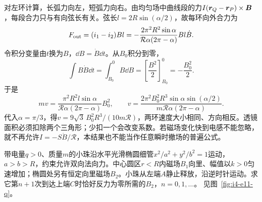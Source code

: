\begin{solution}
对左环计算，长弧力向左，短弧力向右。由均匀场中曲线段的力$I(\bm{r}_Q-\bm{r}_P)\times\bm{B}$，每段合力只与有向弦长有关。弦长$l=2R\sin(\alpha/2)$，故每环向外合力为
\[
F_{\rm out}=(i_1-i_2)Bl
=-\frac{2\pi^2R^2\sin\alpha}{\mathcal R\alpha(2\pi-\alpha)}Bl\dot B.
\]
令积分变量由$t$换为$B$，$\dd B=\dot B\dd t$。从$B_0$积分到零，
\[\int B\dot B\dd t=\int_{B_0}^0B\dd B
=\left[\frac{B^2}{2}\right]_{B_0}^0=-\frac{B_0^2}{2}.\]
于是
\[
mv=\frac{\pi^2R^2l\sin\alpha}{\mathcal R\alpha(2\pi-\alpha)}B_0^2,\qquad
\boxed{v=\frac{2\pi^2B_0^2R^3\sin\alpha\sin(\alpha/2)}
{m\mathcal R\alpha(2\pi-\alpha)}}.
\]
代入$\alpha=\pi/3$，得$\boxed{v=9\sqrt3\,B_0^2R^3/(10m\mathcal R)}$，两环速度大小相同、方向相反。透镜面积必须扣除两个三角形；少扣一个会改变系数。若磁场变化快到电感不能忽略，就不再允许$I=-S\dot B/\mathcal R$，本结果也不能当作任意瞬时撤场的普遍公式。
\end{solution}

\begin{example}[椭圆细管中的感应加速与零反力]\label{ex:i4-e11}

带电量$q>0$、质量$m$的小珠沿水平光滑椭圆细管$x^2/a^2+y^2/b^2=1$运动，$a>b>R$，约束允许双向法向力。中心圆区$r<R$内磁场$B_1$向里、幅值以$k>0$匀速增加；椭圆处另有恒定向里磁场$B_2$。小珠从左端$A$静止释放，沿逆时针运动。求它第$n+1$次到达上端$C$时恰好反力为零所需的$B_2$，$n=0,1,\ldots$。
 见图~\ref{fig:i4-e11-q}。
\end{example}

